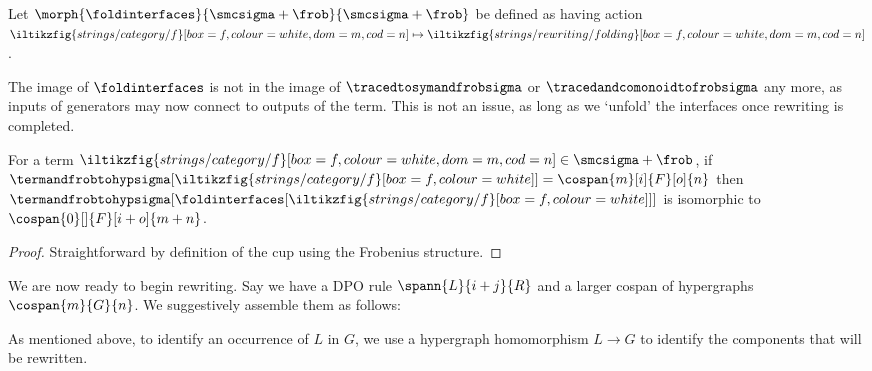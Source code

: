 \begin{definition}\label{def:fold-interfaces}
    Let \(\morph{\foldinterfaces}{\smcsigma + \frob}{\smcsigma + \frob}\)
    be defined as having action \(
    \iltikzfig{strings/category/f}[box=f,colour=white,dom=m,cod=n]
    \mapsto
    \iltikzfig{strings/rewriting/folding}[box=f,colour=white,dom=m,cod=n]
    \).
\end{definition}

The image of \(\foldinterfaces\) is not in the image of
\(\tracedtosymandfrobsigma\) or \(\tracedandcomonoidtofrobsigma\) any more,
as inputs of generators may now connect to outputs of the term.
This is not an issue, as long as we `unfold' the interfaces once rewriting is
completed.

\begin{proposition}
    For a term \(
    \iltikzfig{strings/category/f}[box=f,colour=white,dom=m,cod=n]
    \in
    \smcsigma + \frob
    \), if \(
    \termandfrobtohypsigma[\iltikzfig{strings/category/f}[box=f,colour=white]]
    =
    \cospan{m}[i]{F}[o]{n}
    \) then \(
    \termandfrobtohypsigma[
        \foldinterfaces[
            \iltikzfig{strings/category/f}[box=f,colour=white]
        ]
    ]
    \) is isomorphic to \(
    \cospan{0}[]{F}[i+o]{m + n}
    \).
\end{proposition}
\begin{proof}
    Straightforward by definition of the cup using the Frobenius structure.
\end{proof}

We are now ready to begin rewriting.
Say we have a DPO rule \(\spann{L}{i + j}{R}\) and a larger cospan of
hypergraphs \(\cospan{m}{G}{n}\).
We suggestively assemble them as follows:

\begin{center}
\end{center}

As mentioned above, to identify an occurrence of \(L\) in \(G\), we use a
hypergraph homomorphism \(L \to G\) to identify the components that will be
rewritten.

\begin{center}
\end{center}

